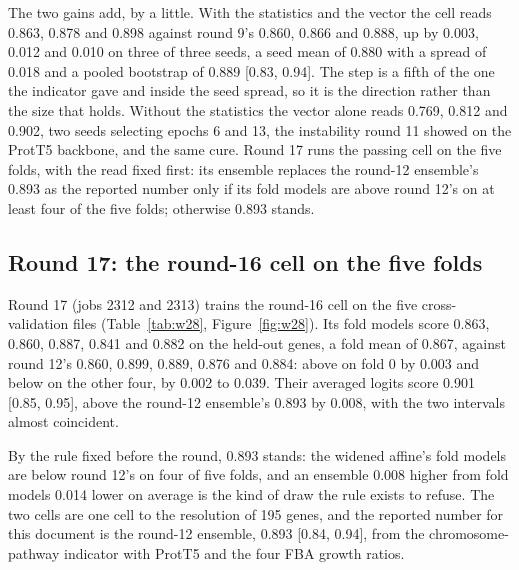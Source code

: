 The two gains add, by a little. With the statistics and the vector the cell reads 0.863,
0.878 and 0.898 against round 9's 0.860, 0.866 and 0.888, up by 0.003, 0.012 and 0.010
on three of three seeds, a seed mean of 0.880 with a spread of 0.018 and a pooled
bootstrap of 0.889 [0.83, 0.94]. The step is a fifth of the one the indicator gave and
inside the seed spread, so it is the direction rather than the size that holds. Without
the statistics the vector alone reads 0.769, 0.812 and 0.902, two seeds selecting
epochs 6 and 13, the instability round 11 showed on the ProtT5 backbone, and the same
cure. Round 17 runs the passing cell on the five folds, with the read fixed first: its
ensemble replaces the round-12 ensemble's 0.893 as the reported number only if its fold
models are above round 12's on at least four of the five folds; otherwise 0.893 stands.

\subsection{Round 17: the round-16 cell on the five folds}

Round 17 (jobs 2312 and 2313) trains the round-16 cell on the five cross-validation
files (Table~\ref{tab:w28}, Figure~\ref{fig:w28}). Its fold models score 0.863, 0.860,
0.887, 0.841 and 0.882 on the held-out genes, a fold mean of 0.867, against round 12's
0.860, 0.899, 0.889, 0.876 and 0.884: above on fold 0 by 0.003 and below on the other
four, by 0.002 to 0.039. Their averaged logits score 0.901 [0.85, 0.95], above the
round-12 ensemble's 0.893 by 0.008, with the two intervals almost coincident.




By the rule fixed before the round, 0.893 stands: the widened affine's fold models are
below round 12's on four of five folds, and an ensemble 0.008 higher from fold models
0.014 lower on average is the kind of draw the rule exists to refuse. The two cells are
one cell to the resolution of 195 genes, and the reported number for this document is
the round-12 ensemble, 0.893 [0.84, 0.94], from the chromosome-pathway indicator with
ProtT5 and the four FBA growth ratios.
